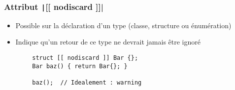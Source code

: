 \documentclass[C++.tex]{subfiles}
\begin{document}
\begin{frame}[fragile]
	\frametitle{Attribut \texttt|[[ nodiscard ]]|}
	\begin{itemize}
		\item Possible sur la déclaration d'un type (classe, structure ou énumération)
		\item Indique qu'un retour de ce type ne devrait jamais être ignoré
	\end{itemize}

	\begin{verbatim}
		struct [[ nodiscard ]] Bar {};
		Bar baz() { return Bar{}; }

		baz();  // Idealement : warning
	\end{verbatim}


\end{frame}
\end{document}
